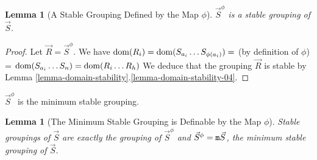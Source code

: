 \documentclass{lmcs}
\newtheorem{lemma}[theorem]{Lemma}
\begin{document}
\begin{lemma} [A Stable Grouping Defined by the Map $\phi$]
\label{lemma-stable-phi-1}
$\vec{S}^\phi$ is a stable grouping of $\vec{S}$.
\end{lemma}

\begin{proof}
Let $\vec{R} = \vec{S}^\phi$. We have
$
{\rm dom}(R_i) = 
{\rm dom}(S_{a_i}\ldots S_{\phi(a_i)}) = 
$ 
(by definition of $\phi$)  = 
$
{\rm dom}(S_{a_i}\ldots S_{n}) =
{\rm dom}(R_{i}\ldots R_h)
$
We deduce that the grouping $\vec{R}$ is stable by 
Lemma \ref{lemma-domain-stability}.\ref{lemma-domain-stability-04}.
\end{proof}

$\vec{S}^\phi$ is the minimum stable grouping.

\begin{lemma} [The Minimum Stable Grouping is Definable by the Map $\phi$]
\label{lemma-stable-phi-2}
Stable groupings of $\vec{S}$ are exactly the grouping of $\vec{S}^\phi$
and $\vec{S}^\phi={\tt m}{\vec{S}}$, the minimum stable grouping of $\vec{S}$.
\end{lemma}
\end{document}
